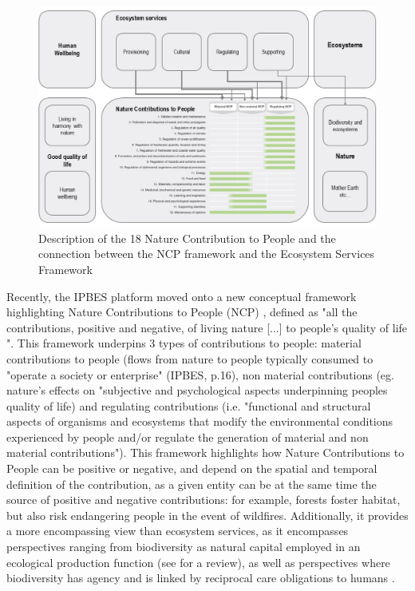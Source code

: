 \begin{figure}[h]
	\centering
	\includegraphics[width = \textwidth]{figures/intro/NCPs2.jpg}
	\caption{Description of the 18 Nature Contribution to People and the connection between the NCP framework \citep{ipbes_2022_6417333} and the Ecosystem Services Framework \citep{millennium2005ecosystems}}
\end{figure}

Recently, the IPBES platform moved onto a new conceptual framework highlighting Nature Contributions to People (NCP) \citep{DIAZ20151}, defined as "all the contributions, positive and negative, of living nature [...] to people's quality of life \citep{diaz_2018}". This framework underpins 3 types of contributions to people: material contributions to people (flows from nature to people typically consumed to "operate a society or enterprise" (IPBES, p.16), non material contributions (eg. nature's effects on "subjective and psychological aspects underpinning peoples quality of life) and regulating contributions (i.e. "functional and structural aspects of organisms and ecosystems that modify the environmental conditions experienced by people and/or regulate the generation of material and non material contributions"). This framework highlights how Nature Contributions to People can be positive or negative, and depend on the spatial and temporal definition of the contribution, as a given entity can be at the same time the source of positive and negative contributions: for example, forests foster habitat, but also risk endangering people in the event of wildfires. Additionally, it provides a more encompassing view than ecosystem services, as it encompasses perspectives ranging from biodiversity as natural capital employed in an ecological production function (see \cite{polasky_integrating_2009} for a review), as well as perspectives where biodiversity has agency and is linked by reciprocal care obligations to humans \citep{descola}. 


